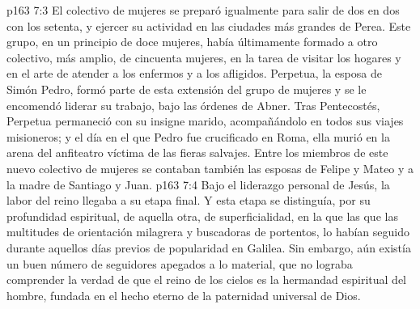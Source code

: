 \vs p163 7:3 El colectivo de mujeres se preparó igualmente para salir de dos en dos con los setenta, y ejercer su actividad en las ciudades más grandes de Perea. Este grupo, en un principio de doce mujeres, había últimamente formado a otro colectivo, más amplio, de cincuenta mujeres, en la tarea de visitar los hogares y en el arte de atender a los enfermos y a los afligidos. Perpetua, la esposa de Simón Pedro, formó parte de esta extensión del grupo de mujeres y se le encomendó liderar su trabajo, bajo las órdenes de Abner. Tras Pentecostés, Perpetua permaneció con su insigne marido, acompañándolo en todos sus viajes misioneros; y el día en el que Pedro fue crucificado en Roma, ella murió en la arena del anfiteatro víctima de las fieras salvajes. Entre los miembros de este nuevo colectivo de mujeres se contaban también las esposas de Felipe y Mateo y a la madre de Santiago y Juan.
\vs p163 7:4 Bajo el liderazgo personal de Jesús, la labor del reino llegaba a su etapa final. Y esta etapa se distinguía, por su profundidad espiritual, de aquella otra, de superficialidad, en la que las que las multitudes de orientación milagrera y buscadoras de portentos, lo habían seguido durante aquellos días previos de popularidad en Galilea. Sin embargo, aún existía un buen número de seguidores apegados a lo material, que no lograba comprender la verdad de que el reino de los cielos es la hermandad espiritual del hombre, fundada en el hecho eterno de la paternidad universal de Dios.
